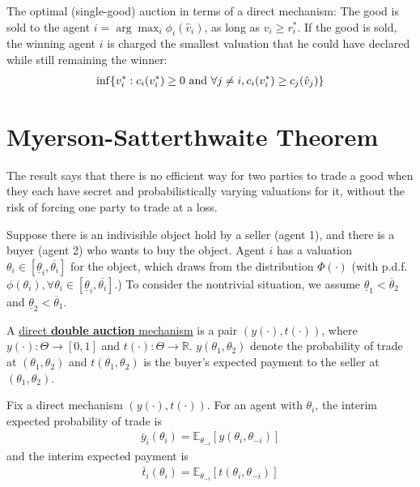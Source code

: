 \documentclass[11pt]{elegantbook_2}
\begin{document}
\begin{theorem}[Myerson (1981)]
    The optimal (single-good) auction in terms of a direct mechanism: The good is sold to the agent $i=\arg\max_i\phi_i(\hat{v}_i)$, as long as $v_i\geq r_i^*$. If the good is sold, the winning agent $i$ is charged the smallest valuation that he could have declared while still remaining the winner:
    \begin{equation}
        \begin{aligned}
            \inf\{v_i^*:c_i(v_i^*)\geq 0 \textnormal{ and }\forall j\neq i, c_i(v_i^*)\geq c_j(\hat{v}_j)\}
        \end{aligned}
        \nonumber
    \end{equation}
\end{theorem}



\section{Myerson-Satterthwaite Theorem}
The result says that there is no efficient way for two parties to trade a good when they each have secret and probabilistically varying valuations for it, without the risk of forcing one party to trade at a loss.

Suppose there is an indivisible object hold by a seller (agent 1), and there is a buyer (agent 2) who wants to buy the object. Agent $i$ has a valuation $\theta_i\in[\underline{\theta}_i,\overline{\theta_i}]$ for the object, which draws from the distribution $\Phi(\cdot)$ (with p.d.f. $\phi(\theta_i),\forall \theta_i\in [\underline{\theta}_i,\overline{\theta_i}]$.) To consider the nontrivial situation, we assume $\underline{\theta}_1<\overline{\theta}_2$ and $\underline{\theta}_2<\overline{\theta}_1$.


\begin{definition}
    A \underline{direct \textbf{double auction} mechanism} is a pair $(y(\cdot),t(\cdot))$, where $y(\cdot):\Theta \rightarrow [0,1]$ and $t(\cdot): \Theta \rightarrow \mathbb{R}$. $y(\theta_1,\theta_2)$ denote the probability of trade at $(\theta_1,\theta_2)$ and $t(\theta_1,\theta_2)$ is the buyer's expected payment to the seller at $(\theta_1,\theta_2)$.
\end{definition}

Fix a direct mechanism $(y(\cdot),t(\cdot))$. For an agent with $\theta_i$, the interim expected probability of trade is
\begin{equation}
    \begin{aligned}
        \bar{y}_i(\theta_i)=\mathbb{E}_{\theta_{-i}}\left[y(\theta_i,\theta_{-i})\right]
    \end{aligned}
    \nonumber
\end{equation}
and the interim expected payment is
\begin{equation}
    \begin{aligned}
        \bar{t}_i(\theta_i)=\mathbb{E}_{\theta_{-i}}\left[t(\theta_i,\theta_{-i})\right]
    \end{aligned}
    \nonumber
\end{equation}
\end{document}
